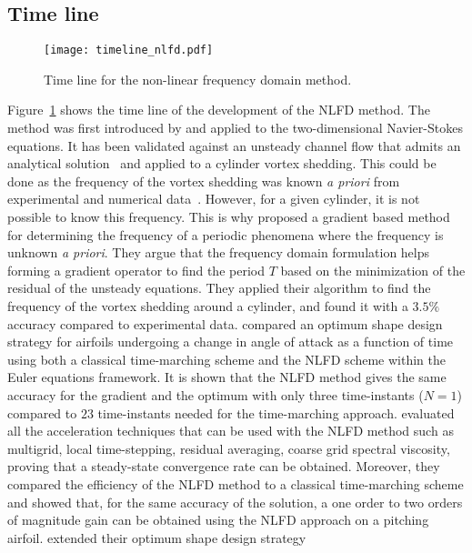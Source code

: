 \subsection{Time line}
\begin{figure}[htbp]
  \centering
  \texttt{[image: timeline\_nlfd.pdf]}
  \caption{Time line for the non-linear frequency domain method.}
  \label{fig:timeline_nlfd}
\end{figure}
Figure~\ref{fig:timeline_nlfd} shows the time line of the
development of the NLFD method.
The method was first introduced by \citet{McMullen2001}
and applied to the two-dimensional
Navier-Stokes equations. It has been validated against an
unsteady channel flow that admits an analytical 
solution~\cite{Merkle1987} and applied to a cylinder
vortex shedding. This could be done as the frequency of the
vortex shedding was known \emph{a priori} from experimental
and numerical data~. However, for a given cylinder, it is not
possible to know this frequency. This is why
 \citet{McMullen2002, McMullen2006a}
proposed a gradient based method for determining the frequency
of a periodic phenomena where the frequency is unknown
\emph{a priori}. They argue that the frequency domain formulation
helps forming a gradient operator to find the period $T$ based
on the minimization of the residual of the unsteady equations.
They applied their algorithm to find the frequency of the vortex
shedding around a cylinder, and found it with a $3.5\%$ accuracy
compared to experimental data.
\citet{Nadarajah2003} compared an optimum shape design 
strategy for 
airfoils undergoing a change 
in angle of attack as a function of time 
using both a classical time-marching scheme
and the NLFD scheme within the Euler equations
framework. It is shown that the NLFD method
gives the same accuracy for the gradient and the optimum with only 
three time-instants ($N=1$)
compared to $23$ time-instants needed for 
the time-marching approach.
\citet{McMullen2006} evaluated all the acceleration techniques
that can be used with the NLFD method such as multigrid, local
time-stepping, residual averaging, coarse grid spectral viscosity,
proving that a steady-state convergence rate can be obtained.
Moreover, they compared the efficiency of the
NLFD method to a classical time-marching
scheme and showed that, for the same accuracy of the
solution, a one order to two orders of magnitude gain can
be obtained using the NLFD approach on a pitching airfoil.
\citet{Nadarajah2007} extended their optimum shape design strategy

